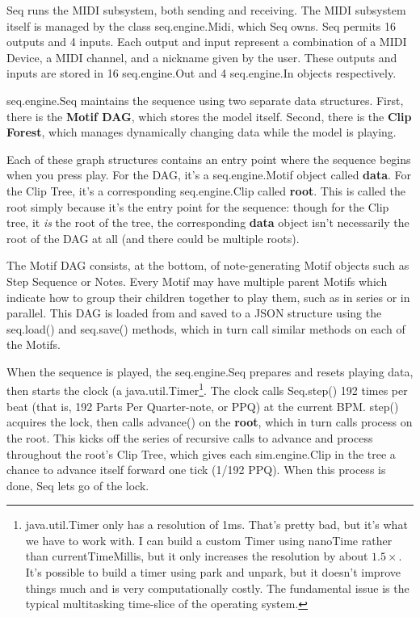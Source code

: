 \documentclass[twoside,10pt]{article}
\begin{document}
Seq runs the MIDI subsystem, both sending and receiving.  The MIDI subsystem itself is managed by the class {\sf seq.engine.Midi}, which Seq owns.  Seq permits 16 outputs and 4 inputs.  Each output and input represent a combination of a MIDI Device, a MIDI channel, and a nickname given by the user.  These outputs and inputs are stored in 16 {\sf seq.engine.Out} and 4 {\sf seq.engine.In} objects respectively.

{\sf seq.engine.Seq} maintains the sequence using two separate data structures.  First, there is the {\bf Motif DAG}, which stores the model itself.  Second, there is the {\bf Clip Forest}, which manages dynamically changing data while the model is playing.  

Each of these graph structures contains an entry point where the sequence begins when you press play.  For the DAG, it's a {\sf seq.engine.Motif} object called {\bf data}.  For the Clip Tree, it's a corresponding {\sf seq.engine.Clip} called {\bf root}.  This is called the root simply because it's the entry point for the sequence: though for the Clip tree, it {\it is} the root of the tree, the corresponding {\bf data} object isn't necessarily the root of the DAG at all (and there could be multiple roots).

The Motif DAG consists, at the bottom, of note-generating Motif objects such as Step Sequence or Notes.  Every Motif may have multiple parent Motifs which indicate how to group their children together to play them, such as in series or in parallel.  This DAG is loaded from and saved to a JSON structure using the {\sf seq.load()} and {\sf seq.save()} methods, which in turn call similar methods on each of the Motifs.

When the sequence is played, the {\sf seq.engine.Seq} prepares and resets playing data, then starts the clock (a {\sf java.util.Timer}\footnote{{\sf java.util.Timer} only has a resolution of 1ms.  That's pretty bad, but it's what we have to work with.  I can build a custom Timer using nanoTime rather than currentTimeMillis, but it only increases the resolution by about \(1.5\times\).  It's possible to build a timer using park and unpark, but it doesn't improve things much and is very computationally costly.  The fundamental issue is the typical multitasking time-slice of the operating system.}.  The clock calls {\sf Seq.step()} 192 times per beat (that is, 192 Parts Per Quarter-note, or PPQ) at the current BPM. {\sf step()} acquires the lock, then calls {\sf advance()} on the {\bf root}, which in turn calls {\sf process} on the root.  This kicks off the series of recursive calls to {\sf advance} and {\sf process} throughout the root's Clip Tree, which gives each {\sf sim.engine.Clip} in the tree a chance to advance itself forward one tick (1/192 PPQ).  When this process is done, Seq lets go of the lock.
\end{document}
